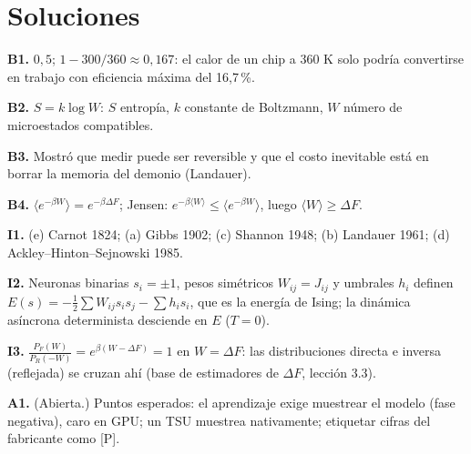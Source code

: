 \documentclass[11pt,a4paper]{article}
\begin{document}
\section{Soluciones}
\begin{solucion}
\textbf{B1.} $0{,}5$; $1-300/360\approx0{,}167$: el calor de un chip a 360 K solo podría convertirse en trabajo con eficiencia máxima del 16,7\,\%.

\textbf{B2.} $S=k\log W$: $S$ entropía, $k$ constante de Boltzmann, $W$ número de microestados compatibles.

\textbf{B3.} Mostró que medir puede ser reversible y que el costo inevitable está en borrar la memoria del demonio (Landauer).

\textbf{B4.} $\langle e^{-\beta W}\rangle=e^{-\beta\Delta F}$; Jensen: $e^{-\beta\langle W\rangle}\le\langle e^{-\beta W}\rangle$, luego $\langle W\rangle\ge\Delta F$.

\textbf{I1.} (e) Carnot 1824; (a) Gibbs 1902; (c) Shannon 1948; (b) Landauer 1961; (d) Ackley--Hinton--Sejnowski 1985.

\textbf{I2.} Neuronas binarias $s_i=\pm1$, pesos simétricos $W_{ij}=J_{ij}$ y umbrales $h_i$ definen $E(s)=-\frac12\sum W_{ij}s_is_j-\sum h_is_i$, que es la energía de Ising; la dinámica asíncrona determinista desciende en $E$ ($T=0$).

\textbf{I3.} $\frac{P_F(W)}{P_R(-W)}=e^{\beta(W-\Delta F)}=1$ en $W=\Delta F$: las distribuciones directa e inversa (reflejada) se cruzan ahí (base de estimadores de $\Delta F$, lección 3.3).

\textbf{A1.} (Abierta.) Puntos esperados: el aprendizaje exige muestrear el modelo (fase negativa), caro en GPU; un TSU muestrea nativamente; etiquetar cifras del fabricante como [P].
\end{solucion}
\end{document}
